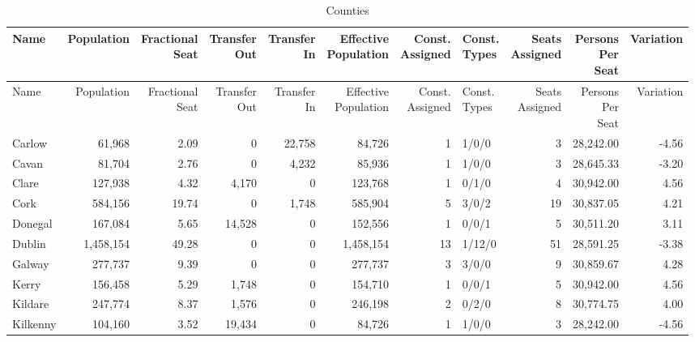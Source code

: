 \documentclass[a4paper]{article}
\begin{document}
\begin{longtable}{lrrrrrrlrrr}
\caption{Counties}
\\ \toprule
Name &Population &\shortstack{Fractional\\Seat} &\shortstack{Transfer\\Out} &\shortstack{Transfer\\In} &\shortstack{Effective\\Population} &\shortstack{Const.\\Assigned} &\shortstack{Const.\\Types} &\shortstack{Seats\\Assigned} &\shortstack{Persons\\Per\\Seat} &Variation \\ \midrule
\endfirsthead
\toprule
Name &Population &\shortstack{Fractional\\Seat} &\shortstack{Transfer\\Out} &\shortstack{Transfer\\In} &\shortstack{Effective\\Population} &\shortstack{Const.\\Assigned} &\shortstack{Const.\\Types} &\shortstack{Seats\\Assigned} &\shortstack{Persons\\Per\\Seat} &Variation \\ \midrule
\endhead
\bottomrule
\endfoot
Carlow&61,968& 2.09&0&22,758&84,726&1&1/0/0&3&28,242.00&-4.56\\ 
Cavan&81,704& 2.76&0&4,232&85,936&1&1/0/0&3&28,645.33&-3.20\\ 
Clare&127,938& 4.32&4,170&0&123,768&1&0/1/0&4&30,942.00& 4.56\\ 
Cork&584,156&19.74&0&1,748&585,904&5&3/0/2&19&30,837.05& 4.21\\ 
Donegal&167,084& 5.65&14,528&0&152,556&1&0/0/1&5&30,511.20& 3.11\\ 
Dublin&1,458,154&49.28&0&0&1,458,154&13&1/12/0&51&28,591.25&-3.38\\ 
Galway&277,737& 9.39&0&0&277,737&3&3/0/0&9&30,859.67& 4.28\\ 
Kerry&156,458& 5.29&1,748&0&154,710&1&0/0/1&5&30,942.00& 4.56\\ 
Kildare&247,774& 8.37&1,576&0&246,198&2&0/2/0&8&30,774.75& 4.00\\ 
Kilkenny&104,160& 3.52&19,434&0&84,726&1&1/0/0&3&28,242.00&-4.56\\ 

\end{longtable}
\end{document}

